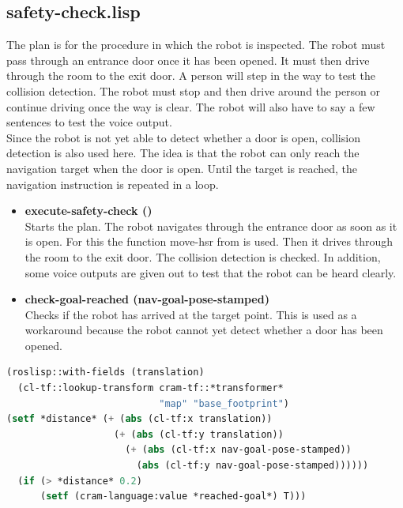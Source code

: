 \documentclass[main.tex]{subfiles}
\begin{document}
	    \subsection{safety-check.lisp}
	    The plan is for the procedure in which the robot is inspected. The robot must pass through an entrance door once it has been opened. It must then drive through the room to the exit door. A person will step in the way to test the collision detection.  The robot must stop and then drive around the person or continue driving once the way is clear. The robot will also have to say a few sentences to test the voice output. \\
			Since the robot is not yet able to detect whether a door is open, collision detection is also used here. The idea is that the robot can only reach the navigation target when the door is open. Until the target is reached, the navigation instruction is repeated in a loop.
	    \begin{itemize}
	    	\item \textbf{execute-safety-check ()} \\
	    	Starts the plan. The robot navigates through the entrance door as soon as it is open. For this the function move-hsr from  is used. Then it drives through the room to the exit door. The collision detection is checked. In addition, some voice outputs are given out to test that the robot can be heard clearly.
	    	\item \textbf{check-goal-reached (nav-goal-pose-stamped)}\\
	    	Checks if the robot has arrived at the target point. This is used as a workaround because the robot cannot yet detect whether a door has been opened.
	    \end{itemize}
			\begin{lstlisting}[language=lisp]
(roslisp::with-fields (translation) 
  (cl-tf::lookup-transform cram-tf::*transformer* 
                           "map" "base_footprint")
(setf *distance* (+ (abs (cl-tf:x translation))
                   (+ (abs (cl-tf:y translation))
                     (+ (abs (cl-tf:x nav-goal-pose-stamped))
                       (abs (cl-tf:y nav-goal-pose-stamped))))))
  (if (> *distance* 0.2) 
      (setf (cram-language:value *reached-goal*) T)))
		  \end{lstlisting}
\end{document}
